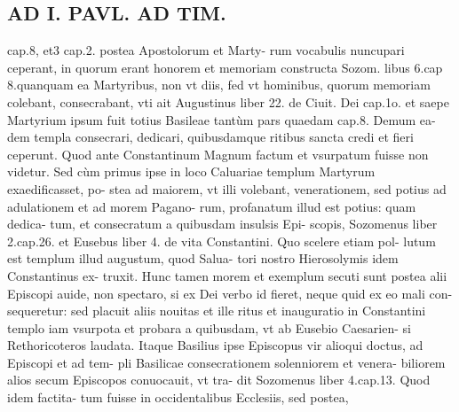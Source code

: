 \documentclass{article}
\begin{document}
\begin{pages}
\section*{AD I. PAVL. AD TIM. }
\marginpar{[ p.72 ]}\pstart cap.8, et3 cap.2. postea Apostolorum et Marty- rum vocabulis nuncupari ceperant, in quorum erant honorem et memoriam constructa Sozom. libus  6.cap 8.quanquam ea Martyribus, non vt diis, fed vt hominibus, quorum memoriam colebant, consecrabant, vti ait Augustinus liber 22. de Ciuit. Dei cap.1o. et saepe Martyrium ipsum fuit totius Basileae tantùm pars quaedam cap.8. Demum ea- dem templa consecrari, dedicari, quibusdamque ritibus sancta credi et fieri ceperunt. Quod ante Constantinum Magnum factum et vsurpatum fuisse non videtur. Sed cùm primus ipse in loco Caluariae templum Martyrum exaedificasset, po- stea ad maiorem, vt illi volebant, venerationem, sed potius ad adulationem et ad morem Pagano- rum, profanatum illud est potius: quam dedica- tum, et consecratum a quibusdam insulsis Epi- scopis, Sozomenus liber 2.cap.26. et Eusebus liber 4. de vita Constantini. Quo scelere etiam pol- lutum est templum illud augustum, quod Salua- tori nostro Hierosolymis idem Constantinus ex- truxit. Hunc tamen morem et exemplum secuti sunt postea alii Episcopi auide, non spectaro, si ex Dei verbo id fieret, neque quid ex eo mali con- sequeretur: sed placuit aliis nouitas et ille ritus et inauguratio in Constantini templo iam vsurpota et probara a quibusdam, vt ab Eusebio Caesarien- si Rethoricoteros laudata. Itaque Basilius ipse Episcopus vir alioqui doctus, ad Episcopi et ad tem- pli Basilicae consecrationem solenniorem et venera- biliorem alios secum Episcopos conuocauit, vt tra- dit Sozomenus liber 4.cap.13. Quod idem factita- tum fuisse in occidentalibus Ecclesiis, sed postea,  \pend

\end{pages}
\end{document}

